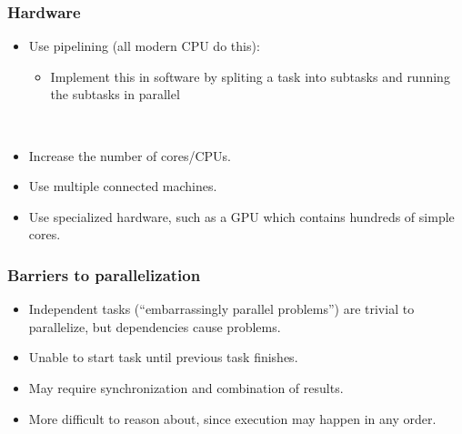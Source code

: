 \documentclass[aspectratio=43]{beamer}
\begin{document}
\begin{frame}
  \frametitle{Hardware}

\hspace*{.2\textwidth}\begin{minipage}{.76\textwidth}
  \begin{itemize}
    \item Use pipelining (all modern CPU do this):
      \begin{itemize}
        \item Implement this in software by spliting a task into subtasks and
              running the subtasks in parallel
      \end{itemize}
    ~\\[1em]
    \item Increase the number of cores/CPUs.
    ~\\[1em]
    \item Use multiple connected machines.
    ~\\[1em]
    \item Use specialized hardware, such as a GPU which contains hundreds of
          simple cores.
  \end{itemize}
\end{minipage}

\end{frame}

\begin{frame}
  \frametitle{Barriers to parallelization}

\hspace*{.1\textwidth}\begin{minipage}{.85\textwidth}
  \begin{itemize}
    \item Independent tasks (``embarrassingly parallel problems'') are
      trivial to parallelize, but dependencies cause problems.\\[1em]
    \item Unable to start task until previous task finishes.\\[1em]
    \item May require synchronization and combination of results.\\[1em]
    \item More difficult to reason about, since execution may happen in any
          order.
  \end{itemize}
\end{minipage}

\end{frame}
\end{document}
